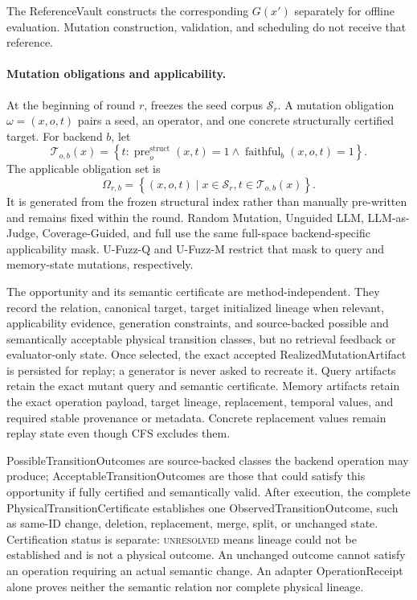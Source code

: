 The ReferenceVault constructs the corresponding \(G(x')\) separately for
offline evaluation. Mutation construction, validation, and scheduling do not
receive that reference.

\paragraph{Mutation obligations and applicability.}
At the beginning of round \(r\), \system freezes the seed corpus
\(\mathcal{S}_r\). A mutation obligation
\(\omega=(x,o,t)\) pairs a seed, an operator, and one concrete structurally
certified target. For backend \(b\), let
\[
\mathcal{T}_{o,b}(x)=
\left\{t:\operatorname{pre}^{\mathrm{struct}}_o(x,t)=1
\land \operatorname{faithful}_b(x,o,t)=1\right\}.
\]
The applicable obligation set is
\begin{equation}
\Omega_{r,b}=
\left\{(x,o,t)\mid x\in\mathcal{S}_r,
t\in\mathcal{T}_{o,b}(x)\right\}.
\label{eq:mutation-obligations}
\end{equation}
It is generated from the frozen structural index rather than manually
pre-written and remains fixed within the round. Random Mutation, Unguided LLM,
LLM-as-Judge, Coverage-Guided, and full \system use the same full-space
backend-specific applicability mask. U-Fuzz-Q and U-Fuzz-M restrict that mask
to query and memory-state mutations, respectively.

The opportunity and its semantic certificate are method-independent. They
record the relation, canonical target, target initialized lineage when
relevant, applicability evidence, generation constraints, and source-backed
possible and semantically acceptable physical transition classes, but no
retrieval feedback or evaluator-only state. Once selected, the exact accepted
RealizedMutationArtifact is persisted
for replay; a generator is never asked to recreate it. Query artifacts retain
the exact mutant query and semantic certificate. Memory artifacts retain the
exact operation payload, target lineage, replacement, temporal values, and
required stable provenance or metadata. Concrete replacement values remain
replay state even though CFS excludes them.

PossibleTransitionOutcomes are source-backed classes the backend operation may
produce; AcceptableTransitionOutcomes are those that could satisfy this
opportunity if fully certified and semantically valid. After execution, the
complete PhysicalTransitionCertificate establishes one
ObservedTransitionOutcome, such as same-ID change, deletion, replacement,
merge, split, or unchanged state. Certification status is separate:
\textsc{unresolved} means lineage could not be established and is not a
physical outcome. An unchanged outcome cannot satisfy an operation requiring
an actual semantic change. An adapter OperationReceipt alone proves neither
the semantic relation nor complete physical lineage.

